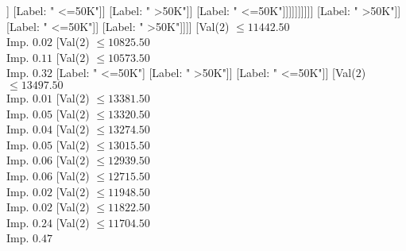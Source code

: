\documentclass[margin=10pt]{standalone}
\begin{document}
\begin{forest}
																																		[Val($2$) $ \leq 9626.50$ \\ Imp. $0.08$
																																			[Label: " <=50K"]
																																			[Val($2$) $ \leq 10065.50$ \\ Imp. $0.05$
																																				[Val($2$) $ \leq 10048.50$ \\ Imp. $0.14$
																																					[Val($2$) $ \leq 9985.50$ \\ Imp. $0.19$
																																						[Val($2$) $ \leq 9866.50$ \\ Imp. $0.47$
																																							[Label: " <=50K"]
																																							[Label: " >50K"]]
																																						[Label: " <=50K"]]
																																					[Label: " >50K"]]
																																				[Label: " <=50K"]]]]]]]]]]
																											[Label: " >50K"]]
																										[Label: " <=50K"]]
																									[Label: " >50K"]]]]
																						[Val($2$) $ \leq 11442.50$ \\ Imp. $0.02$
																							[Val($2$) $ \leq 10825.50$ \\ Imp. $0.11$
																								[Val($2$) $ \leq 10573.50$ \\ Imp. $0.32$
																									[Label: " <=50K"]
																									[Label: " >50K"]]
																								[Label: " <=50K"]]
																							[Val($2$) $ \leq 13497.50$ \\ Imp. $0.01$
																								[Val($2$) $ \leq 13381.50$ \\ Imp. $0.05$
																									[Val($2$) $ \leq 13320.50$ \\ Imp. $0.04$
																										[Val($2$) $ \leq 13274.50$ \\ Imp. $0.05$
																											[Val($2$) $ \leq 13015.50$ \\ Imp. $0.06$
																												[Val($2$) $ \leq 12939.50$ \\ Imp. $0.06$
																													[Val($2$) $ \leq 12715.50$ \\ Imp. $0.02$
																														[Val($2$) $ \leq 11948.50$ \\ Imp. $0.02$
																															[Val($2$) $ \leq 11822.50$ \\ Imp. $0.24$
																																[Val($2$) $ \leq 11704.50$ \\ Imp. $0.47$

\end{forest}
\end{document}
